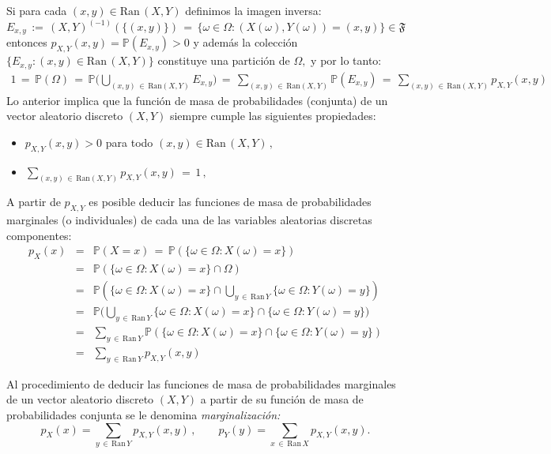 \documentclass[spanish,10pt,letterpaper]{article}
\newcommand{\prob}{\mathbb{P}}
\begin{document}
Si para cada $(x,y)\in\text{Ran}\,(X,Y)$ definimos la imagen inversa:
\begin{equation*}
    E_{x,y} \,:=\, (X,Y)^{(-1)}(\{(x,y)\}) \,=\, \{\omega\in\Omega:(X(\omega),Y(\omega))=(x,y)\}\in\mathfrak{F}
\end{equation*}
entonces $p_{X,Y}(x,y)=\prob(E_{x,y})>0$ y además la colección $\{E_{x,y}:(x,y)\in\text{Ran}\,(X,Y)\}$ constituye una partición de $\Omega,$ y por lo tanto:
\begin{eqnarray*}
    1 \,=\, \prob(\Omega) \,=\, \prob\Big(\bigcup_{(x,y)\,\in\,\text{Ran}(X,Y)}\!\!\!\!\!\!E_{x,y}\Big) \,=\, \sum_{(x,y)\,\in\,\text{Ran}(X,Y)}\!\!\!\!\!\!\!\!\!\!\prob(E_{x,y}) \,=\, \sum_{(x,y)\,\in\,\text{Ran}(X,Y)}\!\!\!\!\!\!\!\!\!\!p_{X,Y}(x,y)
\end{eqnarray*}
Lo anterior implica que la función de masa de probabilidades (conjunta) de un vector aleatorio discreto $(X,Y)$ siempre cumple las siguientes propiedades:
\begin{itemize}
    \item $p_{X,Y}(x,y)>0$ para todo $(x,y)\in\text{Ran}\,(X,Y)\,,$
    \item $\displaystyle{\sum_{(x,y)\,\in\,\text{Ran}(X,Y)}\!\!\!\!\!\!\!\!\!\!p_{X,Y}(x,y)\,=\,1\,,}$
\end{itemize}

\medskip 

A partir de $p_{X,Y}$ es posible deducir las funciones de masa de probabilidades marginales (o individuales) de cada una de las variables aleatorias discretas componentes:
\begin{eqnarray*}
    p_X(x) &=& \prob(X=x) \,=\, \prob(\{\omega\in\Omega:X(\omega)=x\}) \\ 
           &=& \prob(\{\omega\in\Omega:X(\omega)=x\}\cap\Omega) \\
           &=& \prob(\{\omega\in\Omega:X(\omega)=x\}\cap\bigcup_{y\,\in\,\text{Ran}\,Y}\{\omega\in\Omega:Y(\omega)=y\}) \\ 
           &=& \prob\Big(\bigcup_{y\,\in\,\text{Ran}\,Y}\{\omega\in\Omega:X(\omega)=x\}\cap\{\omega\in\Omega:Y(\omega)=y\}\Big) \\ 
           &=& \sum_{y\,\in\,\text{Ran}\,Y} \prob(\{\omega\in\Omega:X(\omega)=x\}\cap\{\omega\in\Omega:Y(\omega)=y\}) \\ 
           &=& \sum_{y\,\in\,\text{Ran}\,Y}p_{X,Y}(x,y)
\end{eqnarray*}

Al procedimiento de deducir las funciones de masa de probabilidades marginales de un vector aleatorio discreto $(X,Y)$ a partir de su función de masa de probabilidades conjunta se le denomina \textit{marginalización:}
\begin{equation}\label{eq:marginaldiscreta}
    p_X(x) = \sum_{y\,\in\,\text{Ran}\,Y}p_{X,Y}(x,y)\,,\qquad p_Y(y) = \sum_{x\,\in\,\text{Ran}\,X}p_{X,Y}(x,y).
\end{equation}
\end{document}
